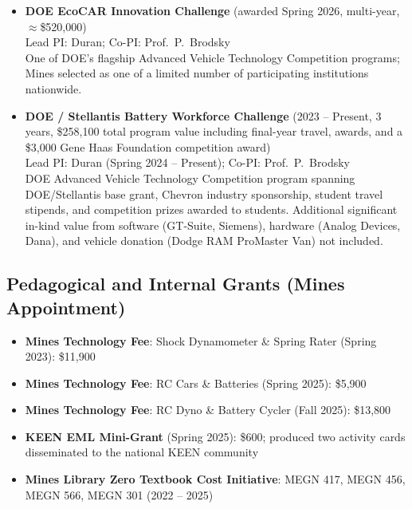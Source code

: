 \documentclass[11pt,letterpaper]{article}
\begin{document}
\begin{itemize}
  \item \textbf{DOE EcoCAR Innovation Challenge} (awarded Spring 2026, multi-year,
        $\approx$\$520,000)\\
        Lead PI: Duran; Co-PI: Prof.\ P.\ Brodsky\\
        One of DOE's flagship Advanced Vehicle Technology Competition programs;
        Mines selected as one of a limited number of participating institutions nationwide.

  \item \textbf{DOE / Stellantis Battery Workforce Challenge} (2023 -- Present, 3 years,
        \$258,100 total program value including final-year travel, awards, and a
        \$3,000 Gene Haas Foundation competition award)\\
        Lead PI: Duran (Spring 2024 -- Present); Co-PI: Prof.\ P.\ Brodsky\\
        DOE Advanced Vehicle Technology Competition program spanning DOE/Stellantis base
        grant, Chevron industry sponsorship, student travel stipends, and competition
        prizes awarded to students. Additional significant in-kind value from software
        (GT-Suite, Siemens), hardware (Analog Devices, Dana), and vehicle donation
        (Dodge RAM ProMaster Van) not included.
\end{itemize}

\subsection{Pedagogical and Internal Grants (Mines Appointment)}

\begin{itemize}
  \item \textbf{Mines Technology Fee}: Shock Dynamometer \& Spring Rater (Spring 2023):
        \$11,900
  \item \textbf{Mines Technology Fee}: RC Cars \& Batteries (Spring 2025):
        \$5,900
  \item \textbf{Mines Technology Fee}: RC Dyno \& Battery Cycler (Fall 2025):
        \$13,800
  \item \textbf{KEEN EML Mini-Grant} (Spring 2025): \$600; produced two activity
        cards disseminated to the national KEEN community
  \item \textbf{Mines Library Zero Textbook Cost Initiative}: MEGN 417, MEGN 456,
        MEGN 566, MEGN 301 (2022 -- 2025)
\end{itemize}
\end{document}
